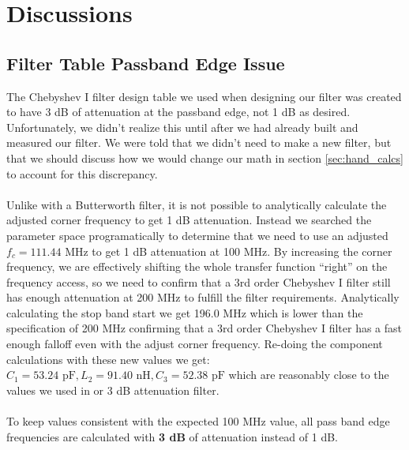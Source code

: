 \documentclass[letterpaper,12pt]{article}
\begin{document}
\newpage
\section{Discussions \label{sec:discussion}}
\subsection{Filter Table Passband Edge Issue}
The Chebyshev I filter design table we used when designing our filter was created to have 3 dB of attenuation at the passband edge, not 1 dB as desired. Unfortunately, we didn't realize this until after we had already built and measured our filter. We were told that we didn't need to make a new filter, but that we should discuss how we would change our math in section \ref{sec:hand_calcs} to account for this discrepancy.
\\
\\
Unlike with a Butterworth filter, it is not possible to analytically calculate the adjusted corner frequency to get 1 dB attenuation. Instead we searched the parameter space programatically to determine that we need to use an adjusted $f_c = 111.44 \text{ MHz}$ to get 1 dB attenuation at 100 MHz. 
By increasing the corner frequency, we are effectively shifting the whole transfer function ``right'' on the frequency access, so we need to confirm that a 3rd order Chebyshev I filter still has enough attenuation at 200 MHz to fulfill the filter requirements. Analytically calculating the stop band start we get 196.0 MHz which is lower than the specification of 200 MHz confirming that a 3rd order Chebyshev I filter has a fast enough falloff even with the adjust corner frequency. Re-doing the component calculations with these new values we get: $C_1 = 53.24 \text{ pF}, L_2 = 91.40 \text{ nH}, C_3 = 52.38 \text{ pF}$ which are reasonably close to the values we used in or 3 dB attenuation filter. \\
\\
To keep values consistent with the expected 100 MHz value, all pass band edge frequencies are calculated with \textbf{3 dB} of attenuation instead of 1 dB.
\end{document}
